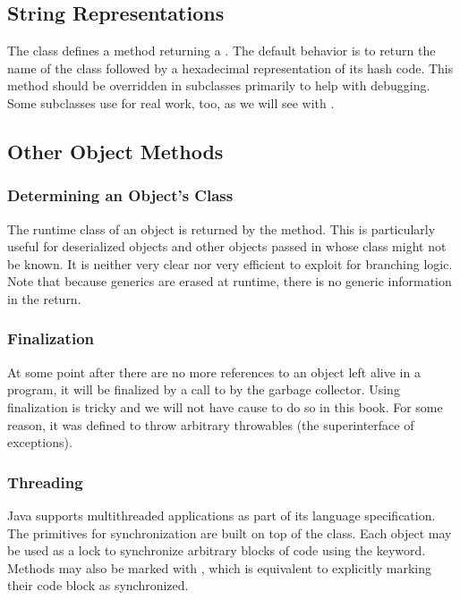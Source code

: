 \subsection{String Representations}

The  class defines a  method returning a
.  The default behavior is to return the name of the
class followed by a hexadecimal representation of its hash code.  This
method should be overridden in subclasses primarily to help with
debugging.  Some subclasses use  for real work, too,
as we will see with .

\subsection{Other Object Methods}

\subsubsection{Determining an Object's Class}

The runtime class of an object is returned by the 
method.  This is particularly useful for deserialized objects and
other objects passed in whose class might not be known.  It is neither
very clear nor very efficient to exploit  for 
branching logic.  Note that because generics are erased at runtime,
there is no generic information in the return.

\subsubsection{Finalization}

At some point after there are no more references to an object left
alive in a program, it will be finalized by a call to 
by the garbage collector.  Using finalization is tricky and we will not
have cause to do so in this book.  For some reason, it was defined
to throw arbitrary throwables (the superinterface of exceptions). 

\subsubsection{Threading}

Java supports multithreaded applications as part of its language
specification.  The primitives for synchronization are built on top of
the  class.  Each object may be used as a lock to
synchronize arbitrary blocks of code using the 
keyword.  Methods may also be marked with , which
is equivalent to explicitly marking their code block as synchronized.

